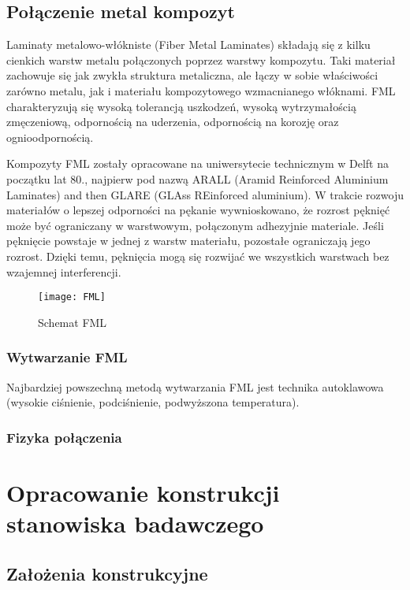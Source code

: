 \documentclass[magister,druk]{dyplom}
\begin{document}
\section{Połączenie metal kompozyt}

Laminaty metalowo-włókniste (Fiber Metal Laminates) składają się z kilku cienkich warstw metalu połączonych poprzez warstwy kompozytu. Taki materiał zachowuje się jak zwykła struktura metaliczna, ale łączy w sobie właściwości zarówno metalu, jak i materiału kompozytowego wzmacnianego włóknami. FML charakteryzują się wysoką tolerancją uszkodzeń, wysoką wytrzymałością zmęczeniową, odpornością na uderzenia, odpornością na korozję oraz ognioodpornością\cite{FML}. 

Kompozyty FML zostały opracowane na uniwersytecie technicznym w Delft na początku lat 80., najpierw pod nazwą ARALL (Aramid Reinforced Aluminium Laminates) and then GLARE (GLAss REinforced aluminium). W trakcie rozwoju materiałów o lepszej odporności na pękanie wywnioskowano, że rozrost pęknięć może być ograniczany w warstwowym, połączonym adhezyjnie materiale. Jeśli pęknięcie powstaje w jednej z warstw materiału, pozostałe ograniczają jego rozrost. Dzięki temu, pęknięcia mogą się rozwijać we wszystkich warstwach bez wzajemnej interferencji. 



\begin{figure}[H]
	\texttt{[image: FML]}
	\centering
	\caption{Schemat FML\cite{FMLold}}
\end{figure}

\subsection{Wytwarzanie FML}

Najbardziej powszechną metodą wytwarzania FML jest technika autoklawowa (wysokie ciśnienie, podciśnienie, podwyższona temperatura). 

\subsection{Fizyka połączenia}

\chapter{Opracowanie konstrukcji stanowiska badawczego}
\section{Założenia konstrukcyjne}
\end{document}
